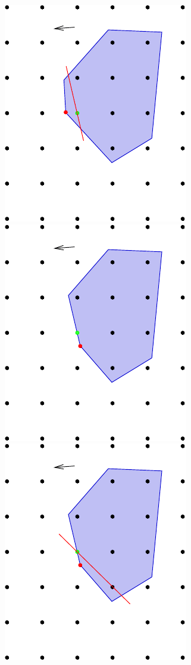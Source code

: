 \begin{figure}[H]
\hspace{0.3cm}
\includegraphics[scale = 0.4]{optimization/figures/figures-static/figureCutttingPlane4}
\hspace{0.3cm}
\includegraphics[scale = 0.4]{optimization/figures/figures-static/figureCutttingPlane5}
\hspace{0.3cm}
\includegraphics[scale = 0.4]{optimization/figures/figures-static/figureCutttingPlane6}

\end{figure}
